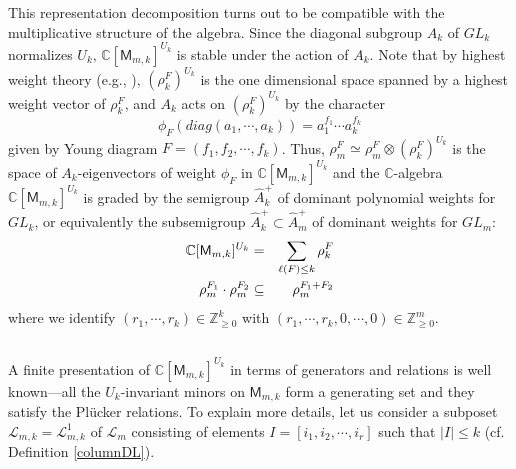 \documentclass[11pt]{amsart}
\numberwithin{equation}{subsection}
\begin{document}
This representation decomposition turns out to be compatible with the
multiplicative structure of the algebra. Since the diagonal subgroup $A_{k}$
of ${GL}_{k}$ normalizes $U_{k}$, $\mathbb{C}[\mathsf{M}_{m,k}]^{U_{k}}$ is
stable under the action of $A_{k}$. Note that by highest weight theory
(e.g., \cite[\S 3.2.1 and \S 12.1.3]{GW09}), $(\rho _{k}^{F})^{U_{k}}$ is the one
dimensional space spanned by a highest weight vector of $\rho _{k}^{F}$, and 
$A_{k}$ acts on $(\rho _{k}^{F})^{U_{k}}$ by the character
\begin{equation*}
\phi_F(diag(a_{1},\cdots ,a_{k})) = a_{1}^{f_{1}}\cdots a_{k}^{f_{k}}
\end{equation*}
given by Young diagram $F=(f_{1},f_{2},\cdots ,f_{k})$. 
Thus, $\rho _{m}^{F}\simeq \rho _{m}^{F}\otimes (\rho_{k}^{F})^{U_{k}}$ is the space 
of $A_{k}$-eigenvectors of weight $\phi_F$ in $\mathbb{C}[\mathsf{M}_{m,k}]^{U_{k}}$ and 
the $\mathbb{C}$-algebra $\mathbb{C}[\mathsf{M}_{m,k}]^{U_{k}}$ is graded by the 
semigroup $\hat{A}_{k}^{+}$ of dominant polynomial weights for ${GL}_{k}$, or equivalently 
the subsemigroup $\hat{A}_{k}^{+}\subset \hat{A}_{m}^{+}$ of dominant weights for ${GL}_{m}$: 
\begin{eqnarray}
\mathbb{C}[\mathsf{M}_{m,k}]^{U_{k}} &=&\sum\limits_{\ell (F)\leq k}
\rho_{k}^{F}  \label{grading1} \\
\rho _{m}^{F_1}\cdot \rho _{m}^{F_2} &\subseteq &\rho_{m}^{F_1 + F_2}  \notag
\end{eqnarray}
where we identify $(r_1, \cdots, r_k) \in \mathbb{Z}_{\geq 0}^k$ with 
$(r_1, \cdots, r_k, 0, \cdots, 0) \in \mathbb{Z}_{\geq 0}^m$.
\subsection{}

A finite presentation of $\mathbb{C}[\mathsf{M}_{m,k}]^{U_{k}}$ 
in terms of generators and relations is well known---all the $U_{k}$-invariant minors on 
$\mathsf{M}_{m,k}$ form a generating set and they satisfy the Pl\"{u}cker relations. 
To explain more details, let us consider a subposet $\mathcal{L}_{m,k}=\mathcal{L}_{m,k}^1$ 
of $\mathcal{L}_{m}$ consisting of elements $I=[i_{1},i_{2},\cdots ,i_{r}]$ such that 
$|I| \leq k$ (cf. Definition \ref{columnDL}). 
\end{document}
